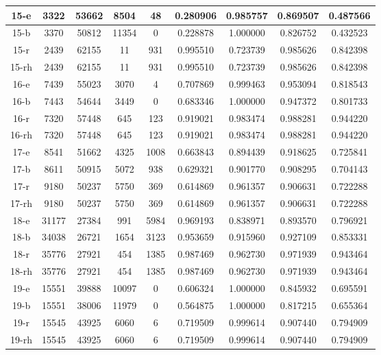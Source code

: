 \begin{longtable}[!h]{|c|c|c|c|c|c|c|c|c|}
	\hline	15-e	&	3322	&	53662	&	8504	&	48	&	0.280906	&	0.985757	&	0.869507	&	0.487566	\\
	\hline \rowcolor{bad}	15-b	&	3370	&	50812	&	11354	&	0	&	0.228878	&	1.000000	&	0.826752	&	0.432523	\\
	\hline \rowcolor{closest}	15-r	&	2439	&	62155	&	11	&	931	&	0.995510	&	0.723739	&	0.985626	&	0.842398	\\
	\hline \rowcolor{closest}	15-rh	&	2439	&	62155	&	11	&	931	&	0.995510	&	0.723739	&	0.985626	&	0.842398	\\
	
	\hline	16-e	&	7439	&	55023	&	3070	&	4	&	0.707869	&	0.999463	&	0.953094	&	0.818543	\\
	\hline \rowcolor{bad}	16-b	&	7443	&	54644	&	3449	&	0	&	0.683346	&	1.000000	&	0.947372	&	0.801733	\\
	\hline \rowcolor{closest}	16-r	&	7320	&	57448	&	645	&	123	&	0.919021	&	0.983474	&	0.988281	&	0.944220	\\
	\hline \rowcolor{closest}	16-rh	&	7320	&	57448	&	645	&	123	&	0.919021	&	0.983474	&	0.988281	&	0.944220	\\
	
	\hline \rowcolor{closest}	17-e	&	8541	&	51662	&	4325	&	1008	&	0.663843	&	0.894439	&	0.918625	&	0.725841	\\
	\hline \rowcolor{bad}	17-b	&	8611	&	50915	&	5072	&	938	&	0.629321	&	0.901770	&	0.908295	&	0.704143	\\
	\hline	17-r	&	9180	&	50237	&	5750	&	369	&	0.614869	&	0.961357	&	0.906631	&	0.722288	\\
	\hline	17-rh	&	9180	&	50237	&	5750	&	369	&	0.614869	&	0.961357	&	0.906631	&	0.722288	\\
	
	\hline \rowcolor{bad}	18-e	&	31177	&	27384	&	991	&	5984	&	0.969193	&	0.838971	&	0.893570	&	0.796921	\\
	\hline	18-b	&	34038	&	26721	&	1654	&	3123	&	0.953659	&	0.915960	&	0.927109	&	0.853331	\\
	\hline \rowcolor{closest}	18-r	&	35776	&	27921	&	454	&	1385	&	0.987469	&	0.962730	&	0.971939	&	0.943464	\\
	\hline \rowcolor{closest}	18-rh	&	35776	&	27921	&	454	&	1385	&	0.987469	&	0.962730	&	0.971939	&	0.943464	\\
	
	\hline	19-e	&	15551	&	39888	&	10097	&	0	&	0.606324	&	1.000000	&	0.845932	&	0.695591	\\
	\hline \rowcolor{bad}	19-b	&	15551	&	38006	&	11979	&	0	&	0.564875	&	1.000000	&	0.817215	&	0.655364	\\
	\hline \rowcolor{closest}	19-r	&	15545	&	43925	&	6060	&	6	&	0.719509	&	0.999614	&	0.907440	&	0.794909	\\
	\hline \rowcolor{closest}	19-rh	&	15545	&	43925	&	6060	&	6	&	0.719509	&	0.999614	&	0.907440	&	0.794909	\\
	

\end{longtable}
